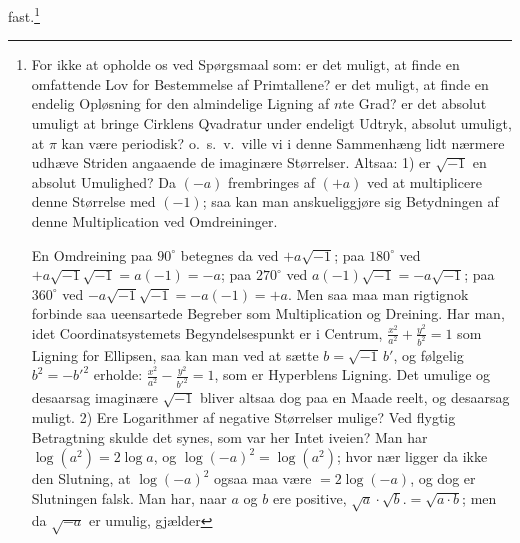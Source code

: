 \documentclass[12pt]{book}
\begin{document}
fast.\footnote{For ikke at opholde os ved Spørgsmaal som: er det muligt, at finde
en omfattende Lov for Bestemmelse af Primtallene? er det muligt, at finde en
endelig Opløsning for den almindelige Ligning af $n$te Grad? er det absolut
umuligt at bringe Cirklens Qvadratur under endeligt Udtryk, absolut umuligt, at
$\pi$ kan være periodisk? o.\ s.\ v.\ ville vi i denne Sammenhæng lidt nærmere
udhæve Striden angaaende de imaginære Størrelser. Altsaa: 1) er $\sqrt{-1}$ en
absolut Umulighed? Da $(-a)$ frembringes af $(+a)$ ved at multiplicere denne
Størrelse med $(-1)$; saa kan man anskueliggjøre sig Betydningen af denne
Multiplication ved Omdreininger.
\begin{center}
\end{center}
En Omdreining paa $90^{\circ}$ betegnes da ved $+a\sqrt{-1}$; paa $180^{\circ}$
ved $+a\sqrt{-1}\sqrt{-1} = a(-1) = -a$; paa $270^{\circ}$ ved
$a(-1)\sqrt{-1} = -a\sqrt{-1}$; paa $360^{\circ}$ ved
$-a\sqrt{-1}\sqrt{-1} = -a(-1) = +a$. Men saa maa man rigtignok forbinde saa
ueensartede Begreber som Multiplication og Dreining. Har man, idet
Coordinatsystemets Begyndelsespunkt er i Centrum,
$\frac{x^{2}}{a^{2}} + \frac{y^{2}}{b^{2}} = 1$ som Ligning for Ellipsen, saa kan
man ved at sætte $b = \sqrt{-1}\,b'$, og følgelig $b^{2} = -{b'}^{2}$ erholde:
$\frac{x^{2}}{a^{2}} - \frac{y^{2}}{{b'}^{2}} = 1$, som er Hyperblens Ligning. Det
umulige og desaarsag imaginære $\sqrt{-1}$ bliver altsaa dog paa en Maade reelt,
og desaarsag muligt. 2) Ere Logarithmer af negative Størrelser mulige? Ved
flygtig Betragtning skulde det synes, som var her Intet iveien? Man har
$\log(a^{2}) = 2\log a$, og $\log(-a)^{2} = \log(a^{2})$; hvor nær ligger da ikke
den Slutning, at $\log(-a)^{2}$ ogsaa maa være $= 2\log(-a)$, og dog er
Slutningen falsk. Man har, naar $a$ og $b$ ere positive,
$\sqrt{a}\cdot\sqrt{b}. = \sqrt{a\cdot b}$; men da $\sqrt{-a}$ er umulig, gjælder
}
\end{document}
